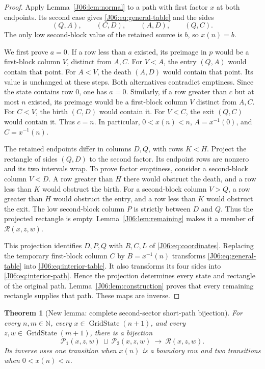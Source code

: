 \documentclass[11pt,oneside]{report}
\newtheorem{theorem}{Theorem}[section]
\theoremstyle{definition}
\numberwithin{equation}{section}
\newcommand{\nat}{\mathbb N}
\newcommand{\cP}{\mathcal P}
\newcommand{\cR}{\mathcal R}
\begin{document}
\begin{proof}
Apply Lemma~\ref{J06:lem:normal} to a path with first factor $x$ at both
endpoints. Its second case gives \eqref{J06:eq:general-table} and the
sides
\[
 (Q,A),\qquad(C,D),\qquad(A,D),\qquad(Q,C).
\]
The only low second-block value of the retained source is $b$, so
$x(n)=b$.

We first prove $a=0$. If a row less than $a$ existed, its preimage in
$p$ would be a first-block column $V$, distinct from $A,C$.
For $V<A$, the entry $(Q,A)$ would contain that point.
For $A<V$, the death $(A,D)$ would contain that point.
Its value is unchanged at these steps. Both alternatives contradict
emptiness. Since the state contains row $0$, one has $a=0$.
Similarly, if a row greater than $c$ but at most $n$ existed, its
preimage would be a first-block column $V$ distinct from $A,C$.
For $C<V$, the birth $(C,D)$ would contain it.
For $V<C$, the exit $(Q,C)$ would contain it.
Thus $c=n$. In particular, $0<x(n)<n$, $A=x^{-1}(0)$,
and $C=x^{-1}(n)$.

The retained endpoints differ in columns $D,Q$, with rows $K<H$.
Project the rectangle of sides $(Q,D)$ to the second factor.
Its endpoint rows are nonzero and its two intervals wrap.
To prove factor emptiness, consider a second-block column $V<D$.
A row greater than $H$ there would obstruct the death, and a row less
than $K$ would obstruct the birth. For a second-block column $V>Q$,
a row greater than $H$ would obstruct the entry, and a row less than
$K$ would obstruct the exit. The low second-block column $P$ is
strictly between $D$ and $Q$. Thus the projected rectangle is empty.
Lemma~\ref{J06:lem:remaining} makes it a member of $\cR(x,z,w)$.

This projection identifies $D,P,Q$ with $R,C,L$ of
\eqref{J06:eq:coordinates}. Replacing the temporary first-block column
$C$ by $B=x^{-1}(n)$ transforms \eqref{J06:eq:general-table} into
\eqref{J06:eq:interior-table}. It also transforms its four sides into
\eqref{J06:eq:interior-path}. Hence the projection determines every state
and rectangle of the original path. Lemma~\ref{J06:lem:construction}
proves that every remaining rectangle supplies that path. These maps
are inverse.
\end{proof}

\begin{theorem}[New lemma: complete second-sector short-path bijection]
\label{J06:thm:short}
For every $n,m\in\nat$, every $x\in\operatorname{GridState}(n+1)$,
and every $z,w\in\operatorname{GridState}(m+1)$, there is a bijection
\[
 \cP_1(x,z,w)\ \sqcup\ \cP_2(x,z,w)
 \ \longrightarrow\ \cR(x,z,w).
\]
Its inverse uses one transition when $x(n)$ is a boundary row and
two transitions when $0<x(n)<n$.
\end{theorem}
\end{document}
